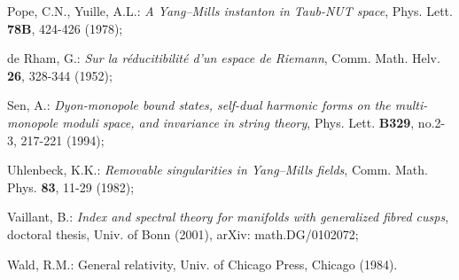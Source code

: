 \documentclass[a4paper,12pt,draft]{article}
\begin{document}
\begin{thebibliography}{99}
 Pope, C.N., Yuille, A.L.: {\it A Yang--Mills instanton
in Taub-NUT space}, Phys. Lett. {\bf 78B}, 424-426 (1978);

 de Rham, G.: {\it Sur la r\'educitibilit\'e d'un espace de
Riemann}, Comm. Math. Helv. {\bf 26}, 328-344 (1952);

 Sen, A.: {\it Dyon-monopole bound states, self-dual
harmonic forms on the multi-monopole moduli space, and \coordHE{}
invariance in string theory}, Phys. Lett. {\bf B329},  no.2-3, 217-221
(1994);

 Uhlenbeck, K.K.: {\it Removable singularities in Yang--Mills
fields}, Comm. Math. Phys. {\bf 83}, 11-29 (1982);
 
 Vaillant, B.: {\it Index and spectral theory for manifolds
with generalized fibred cusps}, doctoral thesis, Univ. of Bonn (2001),
arXiv: math.DG/0102072;

 Wald, R.M.: General relativity, Univ. of Chicago Press,
Chicago (1984).

\end{thebibliography}
\end{document}
